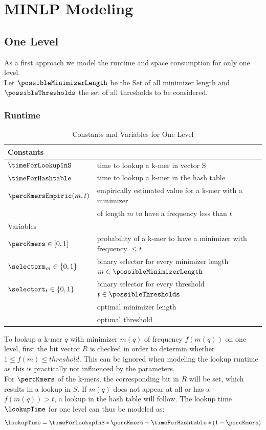 \chapter{MINLP Modeling}\label{chap:minlp}

\section*{One Level}
As a first approach we model the runtime and space consumption for only one level.\\
Let $\possibleMinimizerLength$ be the Set of all minimizer length and $\possibleThresholds$ the set of all thresholds to be considered.
\subsection*{Runtime}

\begin{table}
\caption{Constants and Variables for One Level}
\begin{tabularx}{\columnwidth}{|| l | X ||}
	\hline
	Constants	&  \\
	\hline
	$\timeForLookupInS$		& time to lookup a k-mer in vector S \\
	$\timeForHashtable$		& time to lookup a k-mer in the hash table \\
	$\percKmersEmpiric(m, t)$ &empirically estimated value for a k-mer with a minimizer \\
	& of length $m$ to have a frequency less than $t$ \\
	\hline
	\hline
	Variables	&  \\
	\hline
	$\percKmers \in \left[0,1\right]$ & probability of a k-mer to have a minimizer with frequency $\leq t$ \\
	$\selectorm_m \in \left\{0, 1\right\}$	& binary selector for every minimizer length $m \in \possibleMinimizerLength$\\
	$\selectort_t \in \left\{0, 1\right\}$	& binary selector for every threshold $t \in \possibleThresholds$\\
	\minimizerLength & optimal minimizer length\\
	\threshold & optimal threshold\\
	\hline 
\end{tabularx}
\end{table}

To lookup a k-mer $q$ with minimizer $m(q)$ of frequency $f(m(q))$ on one level, first the bit vector $R$ is checked in order to determin whether $1 \leq f(m) \leq threshold$. This can be ignored when modeling the lookup runtime as this is practically not influenced by the parameters. \\
For $\percKmers$ of the k-mers, the corresponding bit in $R$ will be set, which results in a lookup in $S$. If $m(q)$ does not appear at all or has a $f(m(q)) > t$, a lookup in the hash table will follow. The lookup time $\lookupTime$ for one level can thus be modeled as:
\begin{equation*}
	\lookupTime = \timeForLookupInS * \percKmers + \timeForHashtable * (1-\percKmers)
\end{equation*}

